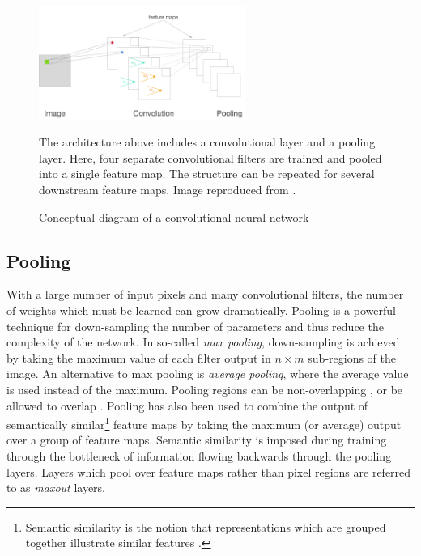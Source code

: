\begin{figure}
  \begin{center}
    \includegraphics[width=0.6\textwidth]{figures/figures/convnet.png}
  \end{center}
  \caption{Conceptual diagram of a convolutional neural network}{
  The architecture above includes a convolutional layer and a pooling
  layer.
  Here, four separate convolutional filters are trained and pooled into a single feature map.  The structure can be repeated for several downstream feature maps.
  Image reproduced from \cite{cnnWikiCitation}.}
  \label{convnet}
\end{figure}

\subsection{Pooling}

With a large number of input pixels and many convolutional filters, the number of weights which must be learned can grow dramatically.
Pooling \cite{lecun2010convolutional} is a powerful technique for down-sampling the number of parameters and thus reduce the complexity of the network.
In so-called \textit{max pooling}, down-sampling is achieved by taking the maximum value of each filter output in $n \times m$ sub-regions of the image.
An alternative to max pooling is \textit{average pooling}, where the average value is used instead of the maximum.  Pooling regions can be non-overlapping \cite{lecun2010convolutional}, or be allowed  to overlap \cite{szegedy2014going,krizhevsky2012imagenet}.
Pooling has also been used to combine the output of semantically
similar\footnote{
Semantic similarity is the notion that representations which are grouped
together illustrate similar features \cite{lecun2015deep,lin2013network}.} feature maps by taking the maximum (or average) output over a group of feature maps\cite{lecun2015deep}.
Semantic similarity is imposed during training through the bottleneck of information flowing backwards through the pooling layers.  Layers which pool over feature maps rather than pixel regions are referred to as
\textit{maxout} layers.

